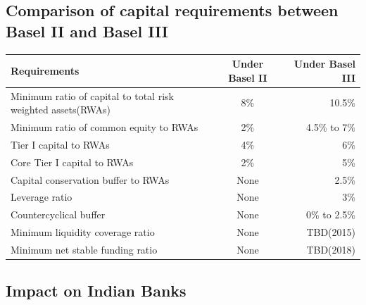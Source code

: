 \documentclass[11pt]{article}
\numberwithin{equation}{section}
\begin{document}
\subsection{Comparison of capital requirements between Basel II and Basel III }
\medskip

\begin{tabular}{|l|c|r|} \hline
Requirements & Under Basel II & Under Basel III \\ \hline
Minimum ratio of capital to total risk weighted assets(RWAs) & 8\% & 10.5\%\\ \hline
Minimum ratio of common equity to RWAs & 2\% & 4.5\% to 7\% \\ \hline
 Tier I capital to RWAs & 4\% & 6\% \\ \hline
 Core Tier I capital to RWAs & 2\% & 5\% \\ \hline
 Capital conservation buffer to RWAs & None & 2.5\% \\ \hline
 Leverage ratio & None & 3\% \\ \hline
 Countercyclical buffer & None & 0\% to 2.5\% \\ \hline
 Minimum liquidity coverage ratio & None & TBD(2015)\\ \hline
 Minimum net stable funding ratio & None & TBD(2018)\\ \hline
 
\end{tabular}

\subsection{Impact on Indian Banks}
\medskip
\end{document}
